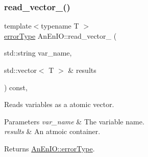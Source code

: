 \mbox{\label{class_an_en_i_o_aa135f278f8ff2a028b8119f483dd36bf}} 
\subsubsection{\texorpdfstring{read\+\_\+vector\+\_\+()}{read\_vector\_()}\hspace{0.1cm}{\footnotesize\ttfamily [1/3]}}
{\footnotesize\ttfamily template$<$typename T $>$ \\
\mbox{\hyperlink{class_an_en_i_o_aa56bc1ec6610b86db4349bce20f9ead0}{error\+Type}} An\+En\+I\+O\+::read\+\_\+vector\+\_\+ (\begin{DoxyParamCaption}\item[{std\+::string}]{var\+\_\+name,  }\item[{std\+::vector$<$ T $>$ \&}]{results }\end{DoxyParamCaption}) const\hspace{0.3cm}{\ttfamily [inline]}, {\ttfamily [protected]}}

Reads variables as a atomic vector.


\begin{DoxyParams}{Parameters}
{\em var\+\_\+name} & The variable name. \\
\hline
{\em results} & An atmoic container. \\
\hline
\end{DoxyParams}
\begin{DoxyReturn}{Returns}
\mbox{\hyperlink{class_an_en_i_o_aa56bc1ec6610b86db4349bce20f9ead0}{An\+En\+I\+O\+::error\+Type}}. 
\end{DoxyReturn}
\mbox{\label{class_an_en_i_o_a4a4b8eedb372df1bb46b2104ae2761cd}} 

